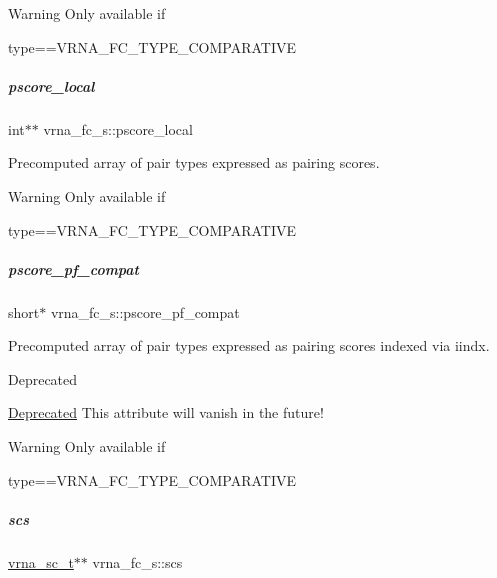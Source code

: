 \begin{DoxyWarning}{Warning}
Only available if\begin{DoxyVerb}type==VRNA_FC_TYPE_COMPARATIVE \end{DoxyVerb}
 
\end{DoxyWarning}
\mbox{\label{group__fold__compound_ad966c15907e6c2e32b0910c7a3154509}} 
\subparagraph{\texorpdfstring{pscore\_local}{pscore\_local}}
{\footnotesize\ttfamily int$\ast$$\ast$ vrna\+\_\+fc\+\_\+s\+::pscore\+\_\+local}



Precomputed array of pair types expressed as pairing scores. 

\begin{DoxyWarning}{Warning}
Only available if\begin{DoxyVerb}type==VRNA_FC_TYPE_COMPARATIVE \end{DoxyVerb}
 
\end{DoxyWarning}
\mbox{\label{group__fold__compound_abf5e82d14649b6179ae60ed7da6e4fc0}} 
\subparagraph{\texorpdfstring{pscore\_pf\_compat}{pscore\_pf\_compat}}
{\footnotesize\ttfamily short$\ast$ vrna\+\_\+fc\+\_\+s\+::pscore\+\_\+pf\+\_\+compat}



Precomputed array of pair types expressed as pairing scores indexed via iindx. 

\begin{DoxyRefDesc}{Deprecated}
\item[\mbox{\hyperlink{deprecated__deprecated000080}{Deprecated}}]This attribute will vanish in the future! \end{DoxyRefDesc}
\begin{DoxyWarning}{Warning}
Only available if\begin{DoxyVerb}type==VRNA_FC_TYPE_COMPARATIVE \end{DoxyVerb}
 
\end{DoxyWarning}
\mbox{\label{group__fold__compound_ac2b047fddabc51a76a96511174e47db1}} 
\subparagraph{\texorpdfstring{scs}{scs}}
{\footnotesize\ttfamily \mbox{\hyperlink{group__soft__constraints_ga75401ce219ef8dbcceb672db82d434c6}{vrna\+\_\+sc\+\_\+t}}$\ast$$\ast$ vrna\+\_\+fc\+\_\+s\+::scs}



